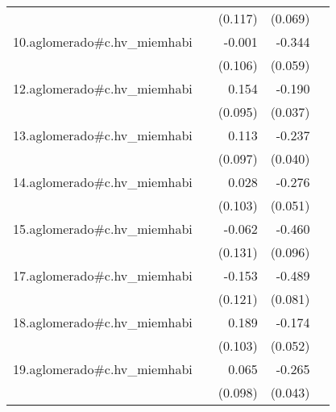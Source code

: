{\begin{longtable}{l*{4}{D{.}{.}{-1}}}
            &                     &     (0.117)         &     (0.069)         &                     \\
\addlinespace
10.aglomerado#c.hv\_miemhabi&                     &      -0.001         &      -0.344\sym{***}&                     \\
            &                     &     (0.106)         &     (0.059)         &                     \\
\addlinespace
12.aglomerado#c.hv\_miemhabi&                     &       0.154         &      -0.190\sym{***}&                     \\
            &                     &     (0.095)         &     (0.037)         &                     \\
\addlinespace
13.aglomerado#c.hv\_miemhabi&                     &       0.113         &      -0.237\sym{***}&                     \\
            &                     &     (0.097)         &     (0.040)         &                     \\
\addlinespace
14.aglomerado#c.hv\_miemhabi&                     &       0.028         &      -0.276\sym{***}&                     \\
            &                     &     (0.103)         &     (0.051)         &                     \\
\addlinespace
15.aglomerado#c.hv\_miemhabi&                     &      -0.062         &      -0.460\sym{***}&                     \\
            &                     &     (0.131)         &     (0.096)         &                     \\
\addlinespace
17.aglomerado#c.hv\_miemhabi&                     &      -0.153         &      -0.489\sym{***}&                     \\
            &                     &     (0.121)         &     (0.081)         &                     \\
\addlinespace
18.aglomerado#c.hv\_miemhabi&                     &       0.189         &      -0.174\sym{***}&                     \\
            &                     &     (0.103)         &     (0.052)         &                     \\
\addlinespace
19.aglomerado#c.hv\_miemhabi&                     &       0.065         &      -0.265\sym{***}&                     \\
            &                     &     (0.098)         &     (0.043)         &                     \\

\end{longtable}}
